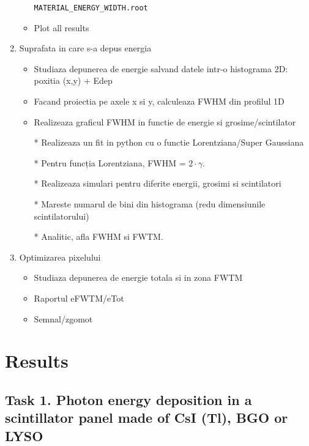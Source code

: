 \documentclass{article}
\begin{document}
\begin{enumerate}
\begin{itemize}
            \verb|MATERIAL_ENERGY_WIDTH.root|
            
            \item Plot all results
        \end{itemize}
    \item Suprafata in care s-a depus energia
        \begin{itemize}
            \item Studiaza depunerea de energie salvand datele intr-o histograma 2D: poxitia (x,y) + Edep
            \item Facand proiectia pe axele x si y, calculeaza FWHM din profilul 1D
            \item Realizeaza graficul FWHM in functie de energie si grosime/scintilator
            \item[*] Realizeaza un fit in python cu o functie Lorentziana/Super Gaussiana
            \item[*] Pentru funcția Lorentziana, FWHM = $2 \cdot \gamma$. 
            \item[*] Realizeaza simulari pentru diferite energii, grosimi si scintilatori
            \item[*] Mareste numarul de bini din histograma (redu dimensiunile scintilatorului) 
            \item[*] Analitic, afla FWHM si FWTM.
        \end{itemize}
    \item Optimizarea pixelului
        \begin{itemize}
            \item Studiaza depunerea de energie totala si in zona FWTM
            \item Raportul eFWTM/eTot
            \item Semnal/zgomot
        \end{itemize}
\end{enumerate}

\newpage

\section{Results}

\subsection{Task 1. Photon energy deposition in a scintillator panel made of CsI (Tl), BGO or LYSO}
\end{document}
